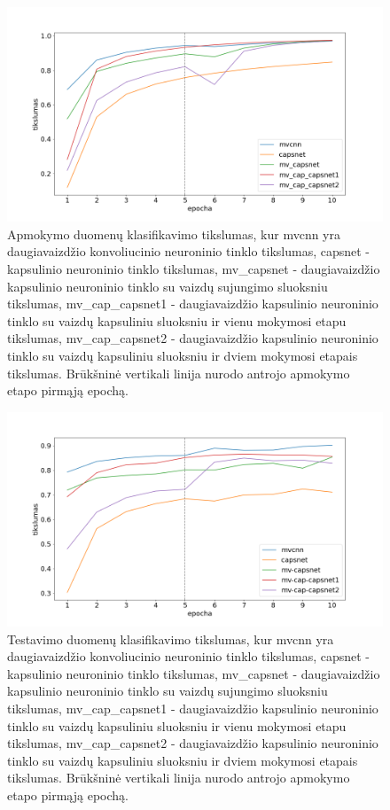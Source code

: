 \begin{figure}[H]
	\centering
	\includegraphics[scale=0.5]{img/trained.png}
	\caption{
		Apmokymo duomenų klasifikavimo tikslumas, kur mvcnn yra daugiavaizdžio konvoliucinio neuroninio tinklo tikslumas, capsnet - kapsulinio neuroninio tinklo tikslumas, mv\_capsnet - daugiavaizdžio kapsulinio neuroninio tinklo su vaizdų sujungimo sluoksniu tikslumas, mv\_cap\_capsnet1 - daugiavaizdžio kapsulinio neuroninio tinklo su vaizdų kapsuliniu sluoksniu ir vienu mokymosi etapu tikslumas, mv\_cap\_capsnet2 - daugiavaizdžio kapsulinio neuroninio tinklo su vaizdų kapsuliniu sluoksniu ir dviem mokymosi etapais tikslumas. Brūkšninė vertikali linija nurodo antrojo apmokymo etapo pirmąją epochą.
	}
	\label{img:train_plot}
\end{figure}

\begin{figure}[H]
	\centering
	\includegraphics[scale=0.5]{img/validated.png}
	\caption{
		Testavimo duomenų klasifikavimo tikslumas, kur mvcnn yra daugiavaizdžio konvoliucinio neuroninio tinklo tikslumas, capsnet - kapsulinio neuroninio tinklo tikslumas, mv\_capsnet - daugiavaizdžio kapsulinio neuroninio tinklo su vaizdų sujungimo sluoksniu tikslumas, mv\_cap\_capsnet1 - daugiavaizdžio kapsulinio neuroninio tinklo su vaizdų kapsuliniu sluoksniu ir vienu mokymosi etapu tikslumas, mv\_cap\_capsnet2 - daugiavaizdžio kapsulinio neuroninio tinklo su vaizdų kapsuliniu sluoksniu ir dviem mokymosi etapais tikslumas. Brūkšninė vertikali linija nurodo antrojo apmokymo etapo pirmąją epochą.
	}
	\label{img:val_plot}
\end{figure}

